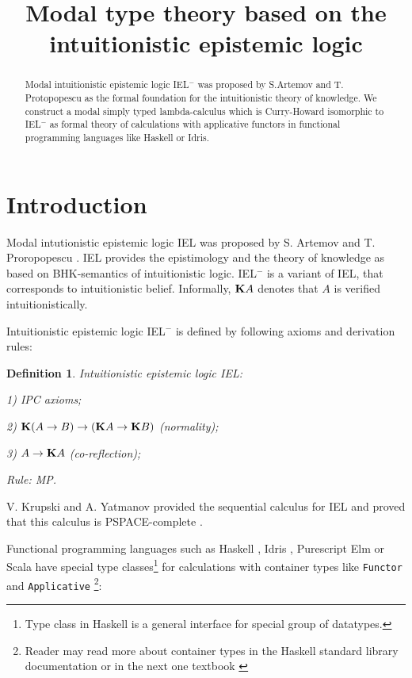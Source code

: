 \documentclass[a4paper]{article}
\date{}
\title{Modal type theory based on the intuitionistic epistemic logic}
\newtheorem{defin}{Definition}
\begin{document}
\maketitle

\begin{abstract}
Modal intuitionistic epistemic logic IEL$^{-}$ was proposed by S.Artemov and T. Protopopescu as the formal
foundation for the intuitionistic theory of knowledge. We construct a modal simply typed lambda-calculus
which is Curry-Howard isomorphic to IEL$^{-}$ as formal theory of calculations with applicative functors in
functional programming languages like Haskell or Idris.
\end{abstract}



  \section{Introduction}

  Modal intutionistic epistemic logic IEL was proposed by S. Artemov and T. Proropopescu \cite{Artemov}. IEL
  provides the epistimology and the theory of knowledge as based on BHK-semantics of intuitionistic logic.
  IEL$^{-}$  is a variant of IEL, that corresponds to intuitionistic belief.
  Informally, ${\bf K}A$ denotes that $A$ is verified intuitionistically.

  Intuitionistic epistemic logic IEL$^{-}$ is defined by following axioms and derivation rules:

  \begin{defin} Intuitionistic epistemic logic IEL:

    1) IPC axioms;

    2) ${\bf K}(A \to B) \to ({\bf K}A \to {\bf K}B)$ (normality);

    3) $A \to {\bf K}A$ (co-reflection);

    Rule: MP.

  \end{defin}

  V. Krupski and  A. Yatmanov provided the sequential calculus for IEL and proved that this calculus is
  PSPACE-complete \cite{Krupski}.

  Functional programming languages such as Haskell \cite{Haskell}, Idris \cite{Idris}, Purescript \cite{Purs}
  Elm \cite{Elm} or Scala \cite{Scala} have special type classes\footnote{Type class in Haskell is a general interface for
  special group of datatypes.} for calculations with container types like \verb"Functor" and
  \verb"Applicative" \footnote{Reader may read more about container types in the Haskell standard library documentation\cite{Base} or in the next one textbook
  \cite{Miran}}:
\end{document}

